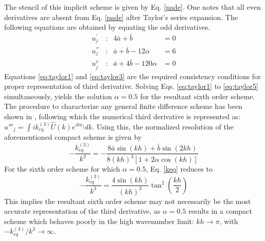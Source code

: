 \documentclass{svjour3}                    %
\begin{document}
The stencil of this implicit scheme is given by Eq. \eqref{pade}. One notes that all even derivatives are absent from Eq. \eqref{pade} after Taylor's series expansion. The following equations are obtained by 
equating the odd derivatives.
\begin{align}
\label{eq:taylor1}
u_{j}^{'}   &:&  4\bar{a} + \bar{b}&=0 \\
\label{eq:taylor3}
u_{j}^{'''} &:  & \bar{a} + \bar{b} - 12\alpha&=6\\
\label{eq:taylor5}
u_{j}^{v}   &:   &\bar{a} +4\bar{b} -120\alpha&=0
\end{align}
Equations \eqref{eq:taylor1} and \eqref{eq:taylor3} are the required consistency conditions for proper representation of third derivative. Solving Eqs. \eqref{eq:taylor1} to \eqref{eq:taylor5} simultaneously, yields the solution $\alpha = 0.5$ for the resultant sixth order scheme. The procedure to characterize any general finite difference scheme has been shown in \cite{Sengupta2003b}, following which the numerical third derivative is represented as: $u'''_j = \int ik_{eq}^{(3)}\hat{U}(k)e^{ikx_j}dk$. Using this, the normalized resolution of the aforementioned compact scheme is given by
\begin{equation}
\label{keq}
- \frac{k_{eq}^{(3)}}{k^3} = - \frac{8\bar{a} \sin(kh)+\bar{b}\sin(2kh)}{8(kh)^3[1+2\alpha\cos(kh)]}
\end{equation}
For the sixth order scheme for which $\alpha = 0.5$, Eq. \eqref{keq} reduces to
\begin{equation}
\label{keq1}
- \frac{k_{eq}^{(3)}}{k^3} = \frac{4\sin(kh)}{(kh)^3} \tan^2\left(\dfrac{kh}{2}\right)
\end{equation}
This implies the resultant sixth order scheme may not necessarily be the most accurate representation of the third derivative, as $\alpha = 0.5$ results in a compact scheme which behaves poorly in the high wavenumber limit: $kh\to\pi$, with $- {k_{eq}^{(3)}}/{k^3} \to \infty$.
\end{document}
